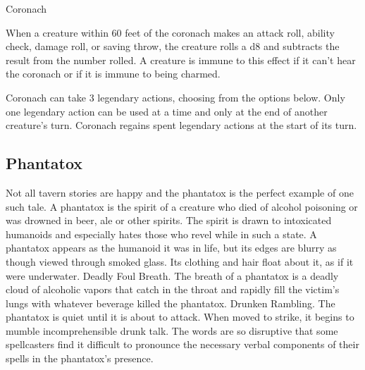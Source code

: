 \documentclass[10pt,a4paper,twoside,twocolumn,openany,bg=print,nodeprecatedcode]{dndbook}
\begin{document}
\begin{DndMonster}[float*=t]{Coronach}
\par
{}
When a creature within 60 feet of the coronach makes an attack roll, ability check, damage roll, or saving throw, the creature rolls a d8 and subtracts the result from the number rolled. A creature is immune to this effect if it can't hear the coronach or if it is immune to being charmed.
\par
{}
Coronach can take 3 legendary actions, choosing from the options below. Only one legendary action can be used at a time and only at the end of another creature's turn. Coronach regains spent legendary actions at the start of its turn.
\begin{DndMonsterLegendaryActions}
\end{DndMonsterLegendaryActions}
\end{DndMonster}


\subsection{Phantatox}
Not all tavern stories are happy and the phantatox is the perfect example of one such tale. A phantatox is the spirit of a creature who died of alcohol poisoning or was drowned in beer, ale or other spirits. The spirit is drawn to intoxicated humanoids and especially hates those who revel while in such a state.
A phantatox appears as the humanoid it was in life, but its edges are blurry as though viewed through smoked glass. Its clothing and hair float about it, as if it were underwater.
Deadly Foul Breath. The breath of a phantatox is a deadly cloud of alcoholic vapors that catch in the throat and rapidly fill the victim's lungs with whatever beverage killed the phantatox.
Drunken Rambling. The phantatox is quiet until it is about to attack. When moved to strike, it begins to mumble incomprehensible drunk talk. The words are so disruptive that some spellcasters find it difficult to pronounce the necessary verbal components of their spells in the phantatox's presence.
\end{document}
